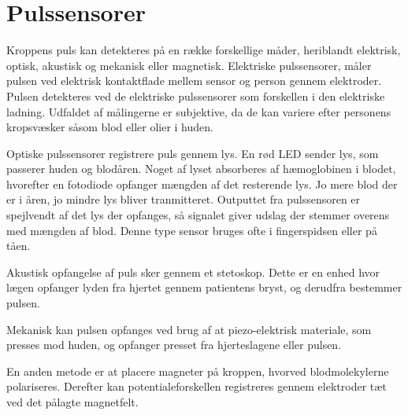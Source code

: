 \section{Pulssensorer}
Kroppens puls kan detekteres på en række forskellige måder, heriblandt elektrisk, optisk, akustisk og mekanisk eller magnetisk. 
\newline
Elektriske pulssensorer, måler pulsen ved elektrisk kontaktflade mellem sensor og person gennem elektroder. Pulsen detekteres ved de elektriske pulssensorer som forskellen i den elektriske ladning. Udfaldet af målingerne er subjektive, da de kan variere efter personens kropsvæsker såsom blod eller olier i huden. 

Optiske pulssensorer registrere puls gennem lys. En rød LED sender lys, som passerer huden og blodåren. Noget af lyset absorberes af hæmoglobinen i blodet, hvorefter en fotodiode opfanger mængden af det resterende lys. Jo mere blod der er i åren, jo mindre lys bliver tranmitteret. Outputtet fra pulssensoren er spejlvendt af det lys der opfanges, så signalet giver udslag der stemmer overens med mængden af blod. Denne type sensor bruges ofte i fingerspidsen eller på tåen. 

Akustisk opfangelse af puls sker gennem et stetoskop. Dette er en enhed hvor lægen opfanger lyden fra hjertet gennem patientens bryst, og derudfra bestemmer pulsen. 

Mekanisk kan pulsen opfanges ved brug af at piezo-elektrisk materiale, som presses mod huden, og opfanger presset fra hjerteslagene eller pulsen. 

En anden metode er at placere magneter på kroppen, hvorved blodmolekylerne polariseres. Derefter kan potentialeforskellen registreres gennem elektroder tæt ved det pålagte magnetfelt. 